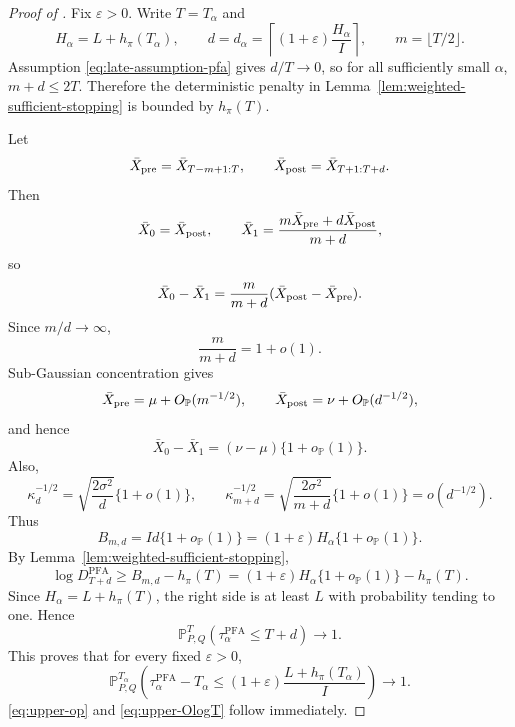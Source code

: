 \documentclass[12pt]{article}
\theoremstyle{spaced}
\theoremstyle{remark}
\newcommand{\bbP}{\mathbb P}
\begin{document}
\begin{proof}[Proof of ]
Fix $\varepsilon>0$.  Write $T=T_\alpha$ and
\[
  H_\alpha=L+h_\pi(T_\alpha),
  \qquad
  d=d_\alpha
  =
  \left\lceil(1+\varepsilon)\frac{H_\alpha}{I}\right\rceil,
  \qquad
  m=\lfloor T/2\rfloor.
\]
Assumption \eqref{eq:late-assumption-pfa} gives $d/T\to 0$, so for all sufficiently small $\alpha$, $m+d\le 2T$.  Therefore the deterministic penalty in Lemma~\ref{lem:weighted-sufficient-stopping} is bounded by $h_\pi(T)$.

Let
\[
  \bar X_{\rm pre}=\bar X_{T-m+1:T},
  \qquad
  \bar X_{\rm post}=\bar X_{T+1:T+d}.
\]
Then
\[
  \bar X_0=\bar X_{\rm post},
  \qquad
  \bar X_1=\frac{m\bar X_{\rm pre}+d\bar X_{\rm post}}{m+d},
\]
so
\begin{equation}
\label{eq:mean-sep-weighted}
  \bar X_0-\bar X_1
  =
  \frac{m}{m+d}(\bar X_{\rm post}-\bar X_{\rm pre}).
\end{equation}
Since $m/d\to\infty$,
\[
  \frac{m}{m+d}=1+o(1).
\]
Sub-Gaussian concentration gives
\[
  \bar X_{\rm pre}=\mu+O_{\bbP}(m^{-1/2}),
  \qquad
  \bar X_{\rm post}=\nu+O_{\bbP}(d^{-1/2}),
\]
and hence
\begin{equation}
\label{eq:sep-weighted-delta}
  \bar X_0-\bar X_1
  =
  (\nu-\mu)\{1+o_{\bbP}(1)\}.
\end{equation}
Also,
\[
  \kappa_d^{-1/2}
  =
  \sqrt{\frac{2\sigma^2}{d}}\{1+o(1)\},
  \qquad
  \kappa_{m+d}^{-1/2}
  =
  \sqrt{\frac{2\sigma^2}{m+d}}\{1+o(1)\}
  =o(d^{-1/2}).
\]
Thus
\[
  B_{m,d}
  =
  I d\{1+o_{\bbP}(1)\}
  =
  (1+\varepsilon)H_\alpha\{1+o_{\bbP}(1)\}.
\]
By Lemma~\ref{lem:weighted-sufficient-stopping},
\[
  \log D_{T+d}^{\mathrm{PFA}}
  \ge
  B_{m,d}-h_\pi(T)
  =
  (1+\varepsilon)H_\alpha\{1+o_{\bbP}(1)\}-h_\pi(T).
\]
Since $H_\alpha=L+h_\pi(T)$, the right side is at least $L$ with probability tending to one.  Hence
\[
  \bbP^T_{P,Q}(\tau_\alpha^{\mathrm{PFA}}\le T+d)\to 1.
\]
This proves that for every fixed $\varepsilon>0$,
\begin{equation}
\label{eq:upper-probability}
  \bbP^{T_\alpha}_{P,Q}
  \left(
    \tau_\alpha^{\mathrm{PFA}}-T_\alpha
    \le
    (1+\varepsilon)\frac{L+h_\pi(T_\alpha)}{I}
  \right)
  \to 1.
\end{equation}
\eqref{eq:upper-op} and \eqref{eq:upper-OlogT} follow immediately.
\end{proof}
\end{document}
